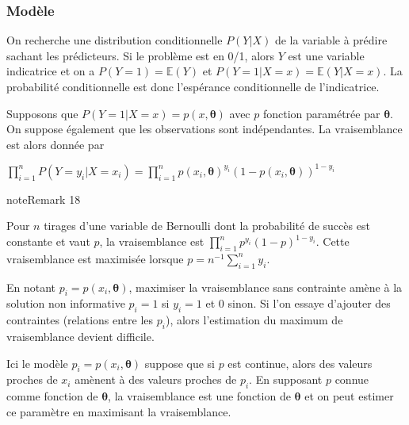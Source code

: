 \documentclass[letterpaper,10pt,english]{jupyterBook}
\begin{document}
\subsubsection{Modèle}
\label{\detokenize{regression:id2}}
\sphinxAtStartPar
On recherche une distribution conditionnelle \(P(Y|X)\) de la variable à prédire sachant les prédicteurs. Si le problème est en 0/1, alors \(Y\) est une variable indicatrice et on a \(P(Y=1)=\mathbb{E}(Y)\) et \(P(Y=1|X=x)=\mathbb{E}(Y|X=x)\). La probabilité conditionnelle est donc l’espérance conditionnelle de l’indicatrice.

\sphinxAtStartPar
Supposons que \(P(Y=1|X=x)=p(x,\boldsymbol\theta)\) avec \(p\) fonction paramétrée par \(\boldsymbol\theta\). On suppose également que les observations sont indépendantes. La vraisemblance est alors donnée par

\sphinxAtStartPar
\(\displaystyle\prod_{i=1}^n P(Y=y_i|X=x_i) = \displaystyle\prod_{i=1}^n p(x_i,\boldsymbol\theta)^{y_i}(1-p(x_i,\boldsymbol\theta))^{1-y_i}\)
\label{regression:remark-6}
\begin{sphinxadmonition}{note}{Remark 18}



\sphinxAtStartPar
Pour \(n\) tirages d’une variable de Bernoulli dont la probabilité de succès est constante et vaut \(p\), la vraisemblance est \(\displaystyle\prod_{i=1}^n p^{y_i}(1-p)^{1-y_i}\). Cette vraisemblance est maximisée lorsque
\(p=n^{-1}\displaystyle\sum_{i=1}^n y_i\).
\end{sphinxadmonition}

\sphinxAtStartPar
En notant \(p_i=p(x_i,\boldsymbol\theta)\), maximiser la vraisemblance sans contrainte amène à la solution non informative \(p_i=1\) si \(y_i=1\) et 0 sinon. Si l’on essaye d’ajouter des contraintes (relations entre les \(p_i\)), alors l’estimation du maximum de vraisemblance devient difficile.

\sphinxAtStartPar
Ici le modèle  \(p_i=p(x_i,\boldsymbol\theta)\) suppose que si \(p\) est continue, alors des valeurs proches de \(x_i\) amènent à des valeurs proches de \(p_i\). En supposant \(p\) connue comme fonction de \(\boldsymbol\theta\), la vraisemblance est une fonction de \(\boldsymbol\theta\) et on peut estimer ce paramètre en maximisant la vraisemblance.
\end{document}
